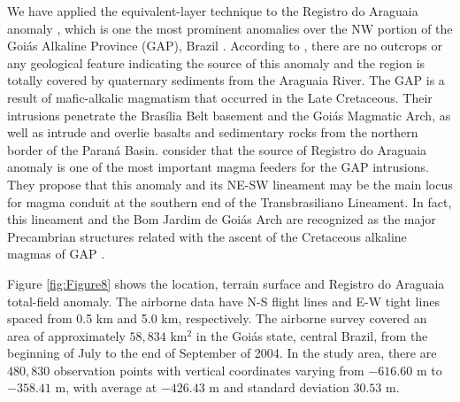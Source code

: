 \documentclass[manuscript,noblind]{geophysics}
\begin{document}
	We have applied the equivalent-layer technique to the Registro do Araguaia anomaly 
	\citep{dutra_etal_2012, marangoni_mantovani_2013, dutra_etal_2014}, which is one the most 
	prominent anomalies over the NW portion of the Goiás Alkaline Province (GAP), Brazil 
	\citep{junqueira-brod_etal_2005}. 
	According to \citet{dutra_etal_2012}, there are no outcrops or any geological feature 
	indicating the source of this anomaly and the region is totally covered by quaternary 
	sediments from the Araguaia River.
	The GAP is a result of maﬁc-alkalic magmatism that occurred in the Late Cretaceous. Their 
	intrusions penetrate the Bras{\'i}lia Belt basement and the Goi{\'a}s Magmatic Arch, as well 
	as intrude and overlie basalts and sedimentary rocks from the northern border of the 
	Paran{\'a} Basin.
	\citet{dutra_etal_2014} consider that the source of Registro do Araguaia anomaly is one of the 
	most important magma feeders for the GAP intrusions. 
	They propose that this anomaly and its NE-SW lineament may be the main locus for magma conduit 
	at the southern end of the Transbrasiliano Lineament.
	In fact, this lineament and the Bom Jardim de Goiás Arch are recognized as the major 
	Precambrian structures related with the ascent of the Cretaceous alkaline magmas of GAP 
	\citep[][ p. 263]{brod_etal2005}.
	
	Figure \ref{fig:Figure8} shows the location, terrain surface and Registro do Araguaia 
	total-field anomaly.
	The airborne data have N-S flight lines and E-W tight lines spaced from 0.5 km and 5.0 km, 
	respectively. 
	The airborne survey covered an area of approximately $58,834$ km$^{2}$ in the Goiás state, 
	central Brazil, from the beginning of July to the end of September of 2004. 
	In the study area, there are $480,830$ observation points with vertical coordinates varying 
	from $-616.60$ m to $-358.41$ m, with average at $-426.43$ m and standard deviation $30.53$ m.
	
\end{document}
